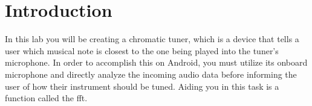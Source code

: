 \section{Introduction}

In this lab you will be creating a chromatic tuner, which is a device that tells a user which musical note is closest to the one being played into the tuner's microphone.
In order to accomplish this on Android, you must utilize its onboard microphone and directly analyze the incoming audio data before informing the user of how their instrument should be tuned.
Aiding you in this task is a function called the \ac{fft}.


